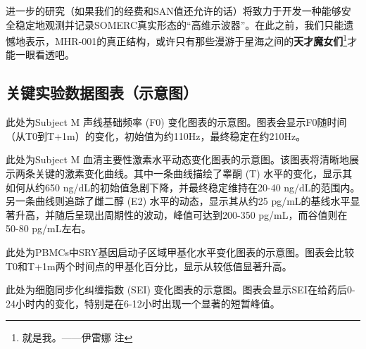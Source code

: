 进一步的研究（如果我们的经费和SAN值还允许的话）将致力于开发一种能够安全稳定地观测并记录SOMERC真实形态的“高维示波器”。在此之前，我们只能遗憾地表示，MHR-001的真正结构，或许只有那些漫游于星海之间的\textbf{天才魔女们}\footnote{就是我。——伊雷娜 注}才能一眼看透吧。

\subsection{关键实验数据图表（示意图）}

此处为Subject M 声线基础频率 (F0) 变化图表的示意图。图表会显示F0随时间（从T0到T+1m）的变化，初始值为约110Hz，最终稳定在约210Hz。

此处为Subject M 血清主要性激素水平动态变化图表的示意图。该图表将清晰地展示两条关键的激素变化曲线。其中一条曲线描绘了睾酮 (T) 水平的变化，显示其如何从约650 ng/dL的初始值急剧下降，并最终稳定维持在20-40 ng/dL的范围内。另一条曲线则追踪了雌二醇 (E2) 水平的动态，显示其从约25 pg/mL的基线水平显著升高，并随后呈现出周期性的波动，峰值可达到200-350 pg/mL，而谷值则在50-80 pg/mL左右。

此处为PBMCs中SRY基因启动子区域甲基化水平变化图表的示意图。图表会比较T0和T+1m两个时间点的甲基化百分比，显示从较低值显著升高。

此处为细胞同步化纠缠指数 (SEI) 变化图表的示意图。图表会显示SEI在给药后0-24小时内的变化，特别是在6-12小时出现一个显著的短暂峰值。

